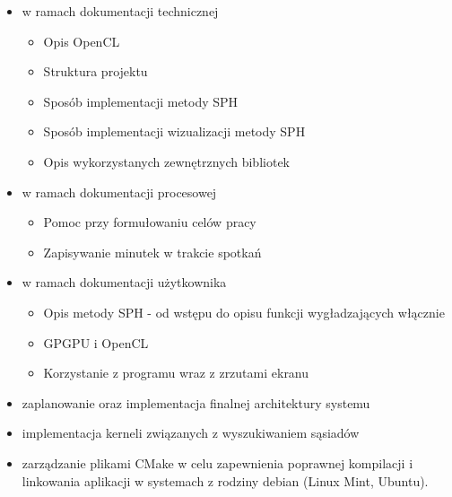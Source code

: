 \documentclass[polish, 12pt]{aghthesis}
\begin{document}
		\begin{itemize}
		
			\item w ramach dokumentacji technicznej
			
				\begin{itemize}
				
					\item Opis OpenCL
					\item Struktura projektu
					\item Sposób implementacji metody SPH
					\item Sposób implementacji wizualizacji metody SPH
					\item Opis wykorzystanych zewnętrznych bibliotek
				
				\end{itemize}
			
			\item w ramach dokumentacji procesowej
			
				\begin{itemize}
				
					\item Pomoc przy formułowaniu celów pracy
					\item Zapisywanie minutek w trakcie spotkań
				
				\end{itemize}
			
			\item w ramach dokumentacji użytkownika
			
				\begin{itemize}
				
					\item Opis metody SPH - od wstępu do opisu funkcji wygładzających włącznie
					
					\item GPGPU i OpenCL
					
					\item Korzystanie z programu wraz z zrzutami ekranu
				
				\end{itemize}
			
			\item zaplanowanie oraz implementacja finalnej architektury systemu
			
			\item implementacja kerneli związanych z wyszukiwaniem sąsiadów
			
			\item zarządzanie plikami CMake w celu zapewnienia poprawnej kompilacji i linkowania aplikacji w systemach z rodziny debian (Linux Mint, Ubuntu).
		
		\end{itemize}
		
\end{document}
